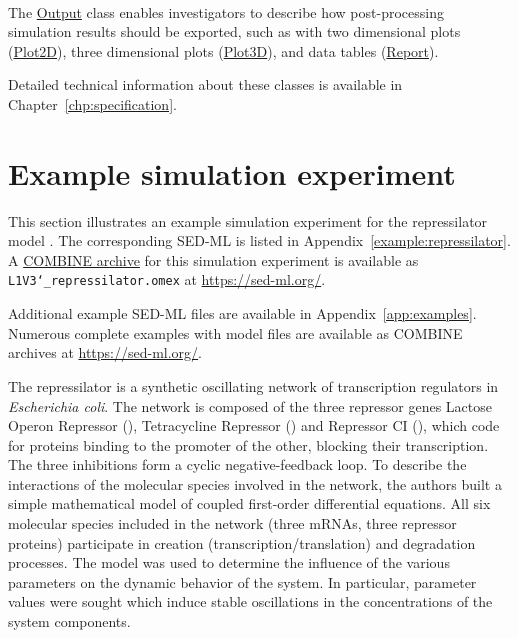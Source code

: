\paragraph*{\Output}
The \hyperref[class:output]{Output} class enables investigators to describe how post-processing simulation results should be exported, such as with two dimensional plots (\hyperref[class:plot2D]{Plot2D}), three dimensional plots (\hyperref[class:plot3D]{Plot3D}), and data tables (\hyperref[class:report]{Report}).

Detailed technical information about these classes is available in Chapter~\ref{chp:specification}. 

\section{Example simulation experiment}
\label{motivation:example}
This section illustrates an example simulation experiment for the repressilator model \citep{Elowitz:2000}. The corresponding SED-ML is listed in Appendix~\ref{example:repressilator}. A \hyperref[sec:archive]{COMBINE archive} for this simulation experiment is available as \texttt{L1V3\char`_repressilator.omex} at \url{https://sed-ml.org/}.

Additional example SED-ML files are available in Appendix~\ref{app:examples}. Numerous complete examples with model files are available as COMBINE archives at \url{https://sed-ml.org/}.

The repressilator is a synthetic oscillating network of transcription regulators in \textit{Escherichia coli}. The network is composed of the three repressor genes Lactose Operon Repressor (), Tetracycline Repressor () and Repressor CI (), which code for proteins binding to the promoter of the other, blocking their transcription. The three inhibitions form a cyclic negative-feedback loop. To describe the interactions of the molecular species involved in the network, the authors built a simple mathematical model of coupled first-order differential equations. All six molecular species included in the network (three mRNAs, three repressor proteins) participate in creation (transcription/translation) and degradation processes. The model was used to determine the influence of the various parameters on the dynamic behavior of the system. In particular, parameter values were sought which induce stable oscillations in the concentrations of the system components.

